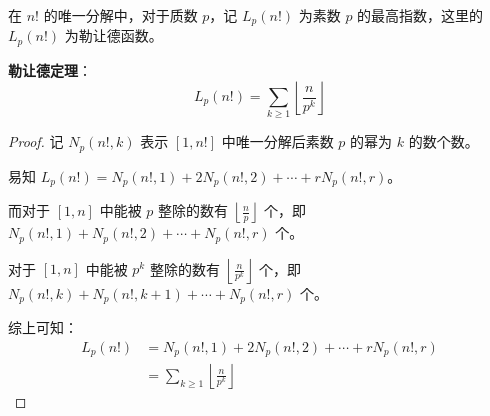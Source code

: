 在 $n!$ 的唯一分解中，对于质数 $p$，记 $L_p(n!)$ 为素数 $p$ 的最高指数，这里的 $L_p(n!)$ 为勒让德函数。

\textbf{勒让德定理}：
\[
L_p(n!) = \sum_{k \ge 1}\left\lfloor\frac{n}{p^k}\right\rfloor
\]

\begin{proof}

记 $N_p(n!, k)$ 表示 $[1, n!]$ 中唯一分解后素数 $p$ 的幂为 $k$ 的数个数。

易知 $L_p(n!) = N_p(n!, 1) + 2N_p(n!, 2) + \cdots + rN_p(n!, r)$。

而对于 $[1, n]$ 中能被 $p$ 整除的数有 $\left\lfloor\frac{n}{p}\right\rfloor$ 个，即 $N_p(n!, 1) + N_p(n!, 2) + \cdots + N_p(n!, r)$ 个。

对于 $[1, n]$ 中能被 $p^k$ 整除的数有 $\left\lfloor\frac{n}{p^k}\right\rfloor$ 个，即 $N_p(n!, k) + N_p(n!, k+1) + \cdots + N_p(n!, r)$ 个。

综上可知：
\[
\begin{aligned}
L_p(n!) &= N_p(n!, 1) + 2N_p(n!, 2) + \cdots + rN_p(n!, r)\\
&= \sum_{k \ge 1}\left\lfloor\frac{n}{p^k}\right\rfloor
\end{aligned}
\]

\end{proof}